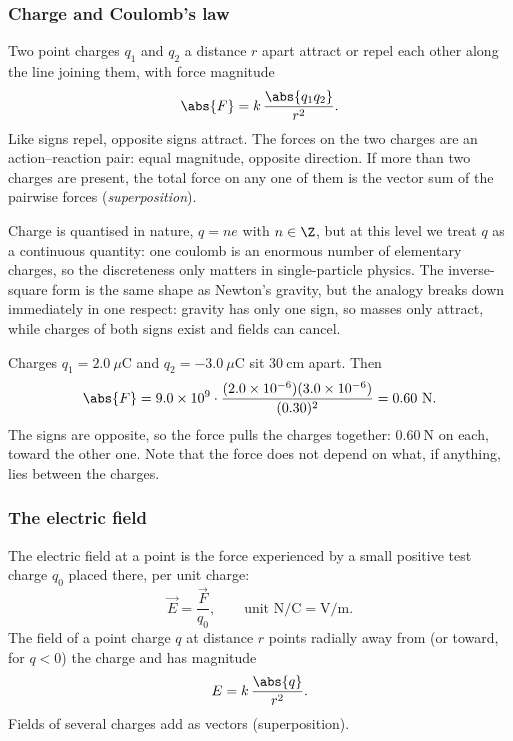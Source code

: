 \subsubsection{Charge and Coulomb's law}

\begin{definition}\label{def:coulomb}
Two point charges $q_1$ and $q_2$ a distance $r$ apart attract or repel each other along the line joining them, with force magnitude
\[
  \abs{F} = k\,\frac{\abs{q_1 q_2}}{r^2}.
\]
Like signs repel, opposite signs attract. The forces on the two charges are an action--reaction pair: equal magnitude, opposite direction. If more than two charges are present, the total force on any one of them is the vector sum of the pairwise forces (\emph{superposition}).
\end{definition}

Charge is quantised in nature, $q = ne$ with $n\in\Z$, but at this level we treat $q$ as a continuous quantity: one coulomb is an enormous number of elementary charges, so the discreteness only matters in single-particle physics. The inverse-square form is the same shape as Newton's gravity, but the analogy breaks down immediately in one respect: gravity has only one sign, so masses only attract, while charges of both signs exist and fields can cancel.

\begin{example}\label{exm:two-charges}
Charges $q_1 = 2.0\ \mu\mathrm{C}$ and $q_2 = -3.0\ \mu\mathrm{C}$ sit $30\ \mathrm{cm}$ apart. Then
\[
  \abs{F} = 9.0\times 10^{9}\cdot\frac{(2.0\times 10^{-6})(3.0\times 10^{-6})}{(0.30)^2} = 0.60\ \mathrm{N}.
\]
The signs are opposite, so the force pulls the charges together: $0.60\ \mathrm{N}$ on each, toward the other one. Note that the force does not depend on what, if anything, lies between the charges.
\end{example}

\subsubsection{The electric field}

\begin{definition}\label{def:field}
The electric field at a point is the force experienced by a small positive test charge $q_0$ placed there, per unit charge:
\[
  \vec{E} = \frac{\vec{F}}{q_0}, \qquad \text{unit } \mathrm{N/C} = \mathrm{V/m}.
\]
The field of a point charge $q$ at distance $r$ points radially away from (or toward, for $q<0$) the charge and has magnitude
\[
  E = k\,\frac{\abs{q}}{r^2}.
\]
Fields of several charges add as vectors (superposition).
\end{definition}

